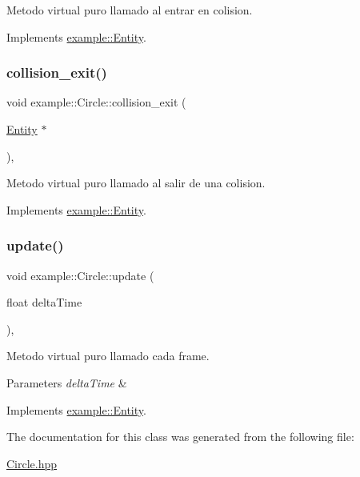 Metodo virtual puro llamado al entrar en colision. 



Implements \mbox{\hyperlink{classexample_1_1_entity_a09f6836192c2f8bce91a7b4f6934b94e}{example\+::\+Entity}}.

\mbox{\label{classexample_1_1_circle_ab8570fcf0357a37d6f9f354c0d02c725}} 
\subsubsection{\texorpdfstring{collision\_exit()}{collision\_exit()}}
{\footnotesize\ttfamily void example\+::\+Circle\+::collision\+\_\+exit (\begin{DoxyParamCaption}\item[{\mbox{\hyperlink{classexample_1_1_entity}{Entity}} $\ast$}]{ }\end{DoxyParamCaption})\hspace{0.3cm}{\ttfamily [override]}, {\ttfamily [virtual]}}



Metodo virtual puro llamado al salir de una colision. 



Implements \mbox{\hyperlink{classexample_1_1_entity_ae5d520b5f0dda6bb56a6c74eaf1c850c}{example\+::\+Entity}}.

\mbox{\label{classexample_1_1_circle_a49dfe984ad6e169dae2a651d79951475}} 
\subsubsection{\texorpdfstring{update()}{update()}}
{\footnotesize\ttfamily void example\+::\+Circle\+::update (\begin{DoxyParamCaption}\item[{float}]{delta\+Time }\end{DoxyParamCaption})\hspace{0.3cm}{\ttfamily [override]}, {\ttfamily [virtual]}}



Metodo virtual puro llamado cada frame. 


\begin{DoxyParams}{Parameters}
{\em delta\+Time} & \\
\hline
\end{DoxyParams}


Implements \mbox{\hyperlink{classexample_1_1_entity_a5dded5c361451f2cfdf7ed3c7de1194f}{example\+::\+Entity}}.



The documentation for this class was generated from the following file\+:\begin{DoxyCompactItemize}
\item 
\mbox{\hyperlink{_circle_8hpp}{Circle.\+hpp}}\end{DoxyCompactItemize}
